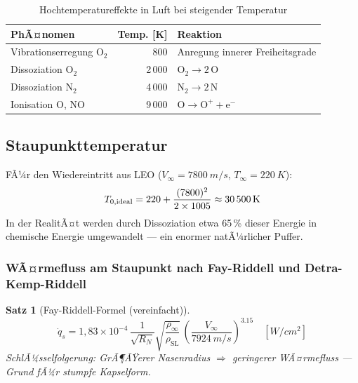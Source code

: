 ﻿\documentclass[12pt,a4paper]{article}
\newtheorem{satz}{Satz}[section]
\begin{document}
\begin{table}[H]
\centering
\caption{Hochtemperatureffekte in Luft bei steigender Temperatur}
\label{tab:hochtemp}
\begin{tabular}{lrl}
\toprule
\textbf{PhÃ¤nomen} & \textbf{Temp. [K]} & \textbf{Reaktion}\\
\midrule
Vibrationserregung O$_2$        & 800    & Anregung innerer Freiheitsgrade\\
Dissoziation O$_2$              & 2\,000 & $\mathrm{O_2 \to 2\,O}$\\
Dissoziation N$_2$              & 4\,000 & $\mathrm{N_2 \to 2\,N}$\\
Ionisation O, NO                & 9\,000 & $\mathrm{O \to O^+ + e^-}$\\
\bottomrule
\end{tabular}
\end{table}

\subsection{Staupunkttemperatur}

FÃ¼r den Wiedereintritt aus LEO ($V_\infty = \SI{7800}{m/s}$, $T_\infty = \SI{220}{K}$):
\[
  T_{0,\text{ideal}} = 220 + \frac{(7800)^2}{2\times1005}
    \approx \SI{30\,500}{K}
\]
In der RealitÃ¤t werden durch Dissoziation etwa 65\,\% dieser Energie in chemische
Energie umgewandelt --- ein enormer natÃ¼rlicher Puffer.

\subsubsection{WÃ¤rmefluss am Staupunkt nach Fay-Riddell und Detra-Kemp-Riddell}

\begin{satz}[Fay-Riddell-Formel (vereinfacht)]
\[
  \dot{q}_s = 1{,}83\times10^{-4}\,\frac{1}{\sqrt{R_N}}
    \sqrt{\frac{\rho_\infty}{\rho_{\mathrm{SL}}}}\,
    \left(\frac{V_\infty}{\SI{7924}{m/s}}\right)^{3.15}
    \quad [\si{W/cm^2}]
\]
SchlÃ¼sselfolgerung: GrÃ¶ÃŸerer Nasenradius $\Rightarrow$ geringerer WÃ¤rmefluss ---
Grund fÃ¼r stumpfe Kapselform.
\end{satz}
\end{document}
